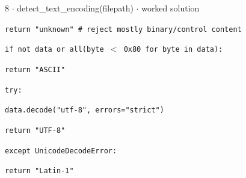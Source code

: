 \documentclass[11pt]{article}
\begin{document}
\begin{keepsection}
\begin{workedbox}{8 \ensuremath{\cdot} detect\_text\_encoding(filepath) \ensuremath{\cdot} worked solution}
\begin{enumerate}
\begin{tcolorbox}[colback=Paperblue,colframe=Paperblue,boxrule=0pt,arc=0pt,left=7pt,right=7pt,top=5pt,bottom=5pt]
\noindent\hspace*{3em}\texttt{return "unknown" \# reject mostly binary/control content}\par
\noindent\hspace*{1em}\texttt{if not data or all(byte \ensuremath{<} 0x80 for byte in data):}\par
\noindent\hspace*{3em}\texttt{return "ASCII"}\par
\noindent\hspace*{1em}\texttt{try:}\par
\noindent\hspace*{3em}\texttt{data.decode("utf-8", errors="strict")}\par
\noindent\hspace*{3em}\texttt{return "UTF-8"}\par
\noindent\hspace*{1em}\texttt{except UnicodeDecodeError:}\par
\noindent\hspace*{3em}\texttt{return "Latin-1"}\par
\end{tcolorbox}
\end{enumerate}
\end{workedbox}

\end{keepsection}
\end{document}
